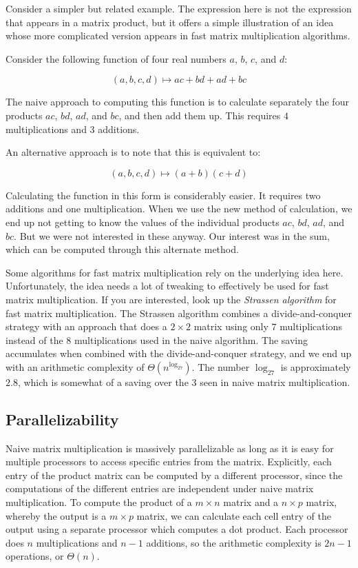 \documentclass[10pt]{amsart}
\begin{document}
Consider a simpler but related example. The expression here
is not the expression that appears in a matrix product, but it offers
a simple illustration of an idea whose more complicated version
appears in fast matrix multiplication algorithms.

Consider the following function of four real numbers $a$, $b$, $c$, and $d$:

$$(a,b,c,d) \mapsto ac + bd + ad + bc$$

The naive approach to computing this function is to calculate
separately the four products $ac$, $bd$, $ad$, and $bc$, and then add
them up. This requires $4$ multiplications and $3$ additions.

An alternative approach is to note that this is equivalent to:

$$(a,b,c,d) \mapsto (a + b)(c + d)$$

Calculating the function in this form is considerably easier. It
requires two additions and one multiplication. When we use the new
method of calculation, we end up not getting to know the values of the
individual products $ac$, $bd$, $ad$, and $bc$. But we were not
interested in these anyway. Our interest was in the sum, which can be
computed through this alternate method.

Some algorithms for fast matrix multiplication rely on the underlying
idea here. Unfortunately, the idea needs a lot of tweaking to
effectively be used for fast matrix multiplication. If you are
interested, look up the {\em Strassen algorithm} for fast matrix
multiplication. The Strassen algorithm combines a divide-and-conquer
strategy with an approach that does a $2 \times 2$ matrix using only
$7$ multiplications instead of the $8$ multiplications used in the
naive algorithm. The saving accumulates when combined with the
divide-and-conquer strategy, and we end up with an arithmetic
complexity of $\Theta(n^{\log_27})$. The number $\log_27$ is
approximately $2.8$, which is somewhat of a saving over the $3$ seen
in naive matrix multiplication.

\subsection{Parallelizability}

Naive matrix multiplication is massively parallelizable as long as it
is easy for multiple processors to access specific entries from the
matrix. Explicitly, each entry of the product matrix can be computed
by a different processor, since the computations of the different
entries are independent under naive matrix multiplication. To compute
the product of a $m \times n$ matrix and a $n \times p$ matrix,
whereby the output is a $m \times p$ matrix, we can calculate each
cell entry of the output using a separate processor which computes a
dot product. Each processor does $n$ multiplications and $n - 1$
additions, so the arithmetic complexity is $2n - 1$ operations, or
$\Theta(n)$.
\end{document}
